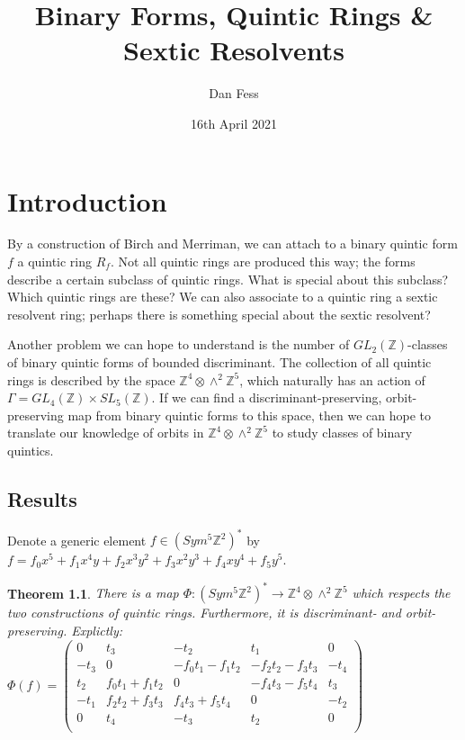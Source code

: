 \documentclass{report}
\begin{document}
\title{Binary Forms, Quintic Rings \& Sextic Resolvents}
\author{Dan Fess}
\date{16th April 2021}
\maketitle

\newtheorem{theorem}{Theorem}
\newtheorem{lemma}{Lemma}[section]
\newtheorem{prop}[lemma]{Proposition}
\newtheorem{corollary}[lemma]{Corollary}
\newtheorem{conjecture}{Conjecture}
\newtheorem{definition}[lemma]{Definition}

\chapter{Introduction}

By a construction of Birch and Merriman, we can attach to a binary quintic form $f$ a quintic ring $R_f$.  Not all quintic rings are produced this way; the forms describe a certain subclass of quintic rings.  What is special about this subclass?  Which quintic rings are these?  We can also associate to a quintic ring a sextic resolvent ring; perhaps there is something special about the sextic resolvent?

Another problem we can hope to understand is the number of $GL_2(\mathbb{Z})$-classes of binary quintic forms of bounded discriminant.  The collection of all quintic rings is described by the space $\mathbb{Z}^4 \otimes \wedge^2 \mathbb{Z}^5$, which naturally has an action of $\Gamma = GL_4(\mathbb{Z}) \times SL_5(\mathbb{Z})$.  If we can find a discriminant-preserving, orbit-preserving map from binary quintic forms to this space, then we can hope to translate our knowledge of orbits in $\mathbb{Z}^4 \otimes \wedge^2 \mathbb{Z}^5$ to study classes of binary quintics.

\section{Results}

Denote a generic element $f \in (Sym^5 \mathbb{Z}^2)^*$ by $f = f_0 x^5 + f_1 x^4 y + f_2 x^3 y^2 + f_3 x^2 y^3 + f_4 x y^4 + f_5 y^5$.

\begin{theorem}
There is a map $\Phi : (Sym^5 \mathbb{Z}^2)^* \to \mathbb{Z}^4 \otimes \wedge^2 \mathbb{Z}^5$ which respects the two constructions of quintic rings.  Furthermore, it is discriminant- and orbit-preserving.  Explictly:\\

$\Phi(f) = \begin{pmatrix}
0 & t_3 & - t_2 & t_1 & 0\\
- t_3 & 0 & -  f_0 t_1 -  f_1 t_2 & -  f_2 t_2 -  f_3 t_3 & - t_4\\
t_2 &  f_0 t_1 +  f_1 t_2 & 0 & -  f_4 t_3 -  f_5 t_4 & t_3\\
- t_1 &  f_2 t_2 +  f_3 t_3 &  f_4 t_3 +  f_5 t_4 & 0 & - t_2\\
0 & t_4 & - t_3 & t_2 & 0\\
\end{pmatrix}$\\
\end{theorem}
\end{document}
